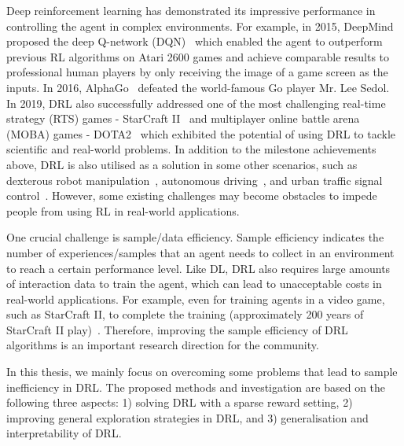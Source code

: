 Deep reinforcement learning has demonstrated its impressive performance in controlling the agent in complex environments. For example, in 2015, DeepMind proposed the deep Q-network (DQN)~\cite{mnih2015human} which enabled the agent to outperform previous RL algorithms on Atari 2600 games and achieve comparable results to professional human players by only receiving the image of a game screen as the inputs. In 2016, AlphaGo~\cite{silver2016mastering} defeated the world-famous Go player Mr. Lee Sedol. In 2019, DRL also successfully addressed one of the most challenging real-time strategy (RTS) games - StarCraft II~\cite{vinyals2019grandmaster} and multiplayer online battle arena (MOBA) games - DOTA2~\cite{berner2019dota} which exhibited the potential of using DRL to tackle scientific and real-world problems. In addition to the milestone achievements above, DRL is also utilised as a solution in some other scenarios, such as dexterous robot manipulation~\cite{andrychowicz2020learning}, autonomous driving~\cite{kiran2021deep}, and urban traffic signal control~\cite{wu2020multi}. However, some existing challenges may become obstacles to impede people from using RL in real-world applications. 

One crucial challenge is sample/data efficiency. Sample efficiency indicates the number of experiences/samples that an agent needs to collect in an environment to reach a certain performance level. Like DL, DRL also requires large amounts of interaction data to train the agent, which can lead to unacceptable costs in real-world applications. For example, even for training agents in a video game, such as StarCraft II,  to complete the training (approximately 200 years of  StarCraft II play)~\cite{vinyals2019grandmaster}. Therefore, improving the sample efficiency of DRL algorithms is an important research direction for the community. 

In this thesis, we mainly focus on overcoming some problems that lead to sample inefficiency in DRL. The proposed methods and investigation are based on the following three aspects: 1) solving DRL with a sparse reward setting, 2) improving general exploration strategies in DRL, and 3) generalisation and interpretability of DRL.

